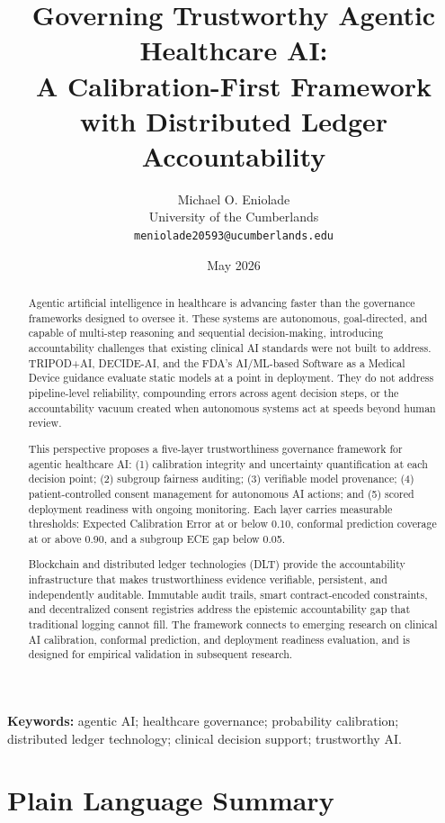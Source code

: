 \documentclass[11pt]{article}
\title{Governing Trustworthy Agentic Healthcare AI:\\
A Calibration-First Framework with Distributed Ledger Accountability}
\author{Michael O. Eniolade\\
University of the Cumberlands\\
\texttt{meniolade20593@ucumberlands.edu}}
\date{May 2026}
\begin{document}
\maketitle

\noindent\textbf{Keywords:} agentic AI; healthcare governance; probability calibration; distributed ledger technology; clinical decision support; trustworthy AI.

\begin{abstract}
Agentic artificial intelligence in healthcare is advancing faster than
the governance frameworks designed to oversee it. These systems are
autonomous, goal-directed, and capable of multi-step reasoning and
sequential decision-making, introducing accountability challenges that
existing clinical AI standards were not built to address. TRIPOD+AI,
DECIDE-AI, and the FDA's AI/ML-based Software as a Medical Device
guidance evaluate static models at a point in deployment. They do not
address pipeline-level reliability, compounding errors across agent
decision steps, or the accountability vacuum created when autonomous
systems act at speeds beyond human review.

This perspective proposes a five-layer trustworthiness governance
framework for agentic healthcare AI: (1) calibration integrity and
uncertainty quantification at each decision point; (2) subgroup
fairness auditing; (3) verifiable model provenance; (4)
patient-controlled consent management for autonomous AI actions; and
(5) scored deployment readiness with ongoing monitoring. Each layer
carries measurable thresholds: Expected Calibration Error at or below
0.10, conformal prediction coverage at or above 0.90, and a subgroup
ECE gap below 0.05.

Blockchain and distributed ledger technologies (DLT) provide the
accountability infrastructure that makes trustworthiness evidence
verifiable, persistent, and independently auditable. Immutable audit
trails, smart contract-encoded constraints, and decentralized consent
registries address the epistemic accountability gap that traditional
logging cannot fill. The framework connects to emerging research on
clinical AI calibration, conformal prediction, and deployment readiness
evaluation, and is designed for empirical validation in subsequent
research.
\end{abstract}


\section*{Plain Language Summary}\label{plain-language-summary}
\end{document}
